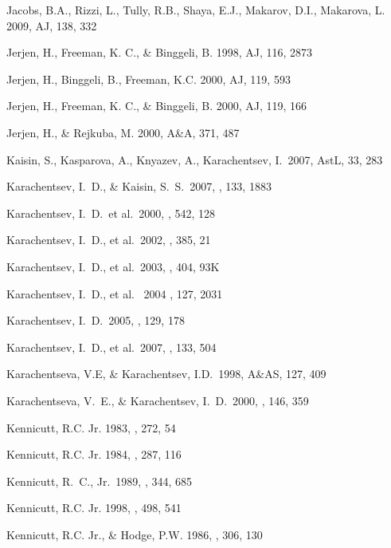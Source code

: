 \documentclass[12pt,preprint]{emulateapj}
\begin{document}
\begin{thebibliography}{}
Jacobs, B.A., Rizzi, L., Tully, R.B., Shaya, E.J., Makarov, D.I., Makarova, L. 2009, AJ, 138, 332
 
Jerjen, H., Freeman, K. C., \& Binggeli, B. 1998, AJ, 116, 2873

Jerjen, H., Binggeli, B., Freeman, K.C. 2000, AJ, 119, 593 

Jerjen, H., Freeman, K. C., \& Binggeli, B. 2000, AJ, 119, 166 
 
Jerjen, H., \& Rejkuba, M. 2000, A\&A, 371, 487 

Kaisin, S., Kasparova, A., Knyazev, A., Karachentsev, I.\ 2007, AstL, 33, 283 

Karachentsev, I.~D., \& Kaisin, S.~S.\ 2007, \aj, 133, 1883 

Karachentsev, I.~D.~et al.\ 2000, \apj, 542, 128 

Karachentsev, I.~D., et al.\ 2002, \aap, 385, 21

Karachentsev, I.~D., et al.\ 2003, \aap, 404, 93K 

Karachentsev, I.~D., et al. \ 2004 \aj, 127, 2031

Karachentsev, I.~D.\ 2005, \aj, 129, 178 

Karachentsev, I.~D., et al.\ 2007, \aj, 133, 504 

Karachentseva, V.E, \& Karachentsev, I.D.\ 1998, A\&AS, 127, 409 

Karachentseva, V.~E., \& Karachentsev, I.~D.\ 2000, \aaps, 146, 359 

Kennicutt, R.C. Jr. 1983, \apj , 272, 54

Kennicutt, R.C. Jr. 1984, \apj , 287, 116

Kennicutt, R.~C., Jr.\ 1989, \apj, 344, 685 

Kennicutt, R.C. Jr. 1998, \apj , 498, 541

Kennicutt, R.C. Jr., \& Hodge, P.W. 1986, \apj , 306, 130


\end{thebibliography}
\end{document}
